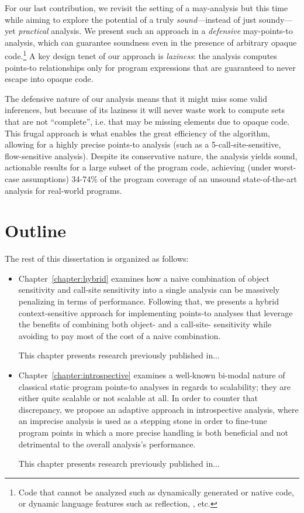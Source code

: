  For our last contribution, we revisit the setting of a may-analysis but this
time while aiming to explore the potential of a truly \emph{sound}---instead of
just soundy---yet \emph{practical} analysis. We present such an approach in a
\emph{defensive} may-points-to analysis, which can guarantee soundness even in
the presence of arbitrary opaque code.\footnote{Code that cannot be analyzed
such as dynamically generated or native code, or dynamic language features such
as reflection, , etc.} A key design tenet of our approach
is \emph{laziness}: the analysis computes points-to relationships only for
program expressions that are guaranteed to never escape into opaque code.

The defensive nature of our analysis means that it might miss some valid
inferences, but because of its laziness it will never waste work to compute
sets that are not ``complete'', i.e. that may be missing elements due to opaque
code. This frugal approach is what enables the great efficiency of the
algorithm, allowing for a highly precise points-to analysis (such as a
5-call-site-sensitive, flow-sensitive analysis). Despite its conservative
nature, the analysis yields sound, actionable results for a large subset of the
program code, achieving (under worst-case assumptions) 34-74\% of the program
coverage of an unsound state-of-the-art analysis for real-world programs.


\section{Outline}

The rest of this dissertation is organized as follows:
\begin{itemize}[$\bullet$]
\item Chapter~\ref{chapter:hybrid} examines how a naive combination of object
	sensitivity and call-site sensitivity into a single analysis can be
	massively penalizing in terms of performance. Following that, we
	presents a hybrid context-sensitive approach for implementing points-to
	analyses that leverage the benefits of combining both object- and a
	call-site- sensitivity while avoiding to pay most of the cost of a
	naive combination.

	This chapter presents research previously published in...

\item Chapter~\ref{chapter:introspective} examines a well-known bi-modal nature
	of classical static program points-to analyses in regards to scalability;
	they are either quite scalable or not scalable at all. In order to
	counter that discrepancy, we propose an adaptive approach in
	introspective analysis, where an imprecise analysis is used as a
	stepping stone in order to fine-tune program points in which a more
	precise handling is both beneficial and not detrimental to the overall
	analysis's performance.

	This chapter presents research previously published in...
\end{itemize}

